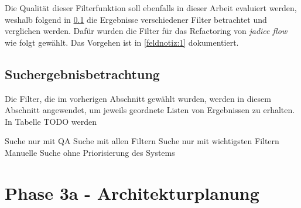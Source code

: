 




Die Qualität dieser Filterfunktion soll ebenfalls in dieser Arbeit evaluiert werden, weshalb folgend in \cref{sec:phase2-ergebnisdurchsicht} die Ergebnisse verschiedener Filter betrachtet und verglichen werden.
Dafür wurden die Filter für das Refactoring von \emph{jadice flow} wie folgt gewählt.
Das Vorgehen ist in \cref{feldnotiz:1} dokumentiert.

\subsection{Suchergebnisbetrachtung}
\label{sec:phase2-ergebnisdurchsicht}

Die Filter, die im vorherigen Abschnitt gewählt wurden, werden in diesem Abschnitt angewendet, um jeweils geordnete Listen von Ergebnissen zu erhalten.
In Tabelle TODO werden



Suche nur mit QA
Suche mit allen Filtern
Suche nur mit wichtigsten Filtern
Manuelle Suche ohne Priorisierung des Systems

\section{Phase 3a - Architekturplanung}
\label{sec:durchführung-phase3}
